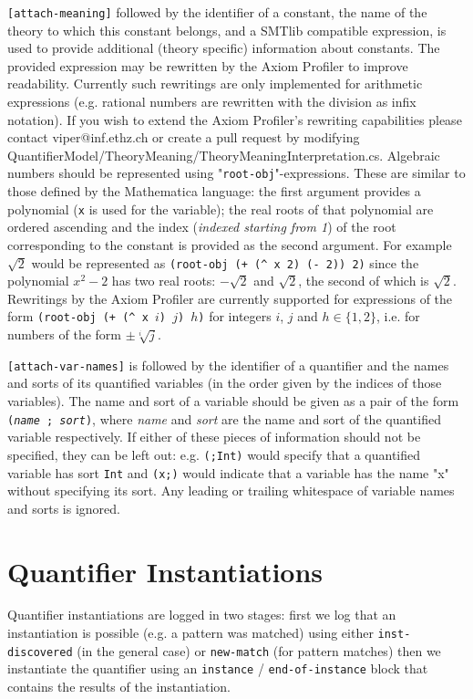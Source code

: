 \documentclass[orivec]{llncs}
\def\noskip{\vspace{-12pt}}
\begin{document}
\texttt{[attach-meaning]} followed by the identifier of a constant, the name of the theory to which this constant belongs, and a SMTlib compatible expression, is used to provide additional (theory specific) information about constants. The provided expression may be rewritten by the Axiom Profiler to improve readability. Currently such rewritings are only implemented for arithmetic expressions (e.g. rational numbers are rewritten with the division as infix notation). If you wish to extend the Axiom Profiler's rewriting capabilities please contact viper@inf.ethz.ch or create a pull request by modifying QuantifierModel/TheoryMeaning/TheoryMeaningInterpretation.cs. Algebraic numbers should be represented using "\texttt{root-obj}"-expressions. These are similar to those defined by the Mathematica language: the first argument provides a polynomial (\texttt{x} is used for the variable); the real roots of that polynomial are ordered ascending and the index (\emph{indexed starting from 1}) of the root corresponding to the constant is provided as the second argument. For example $ \sqrt{2} $ would be represented as \texttt{(root-obj (+ (\textasciicircum\ x 2) (- 2)) 2)} since the polynomial $ x^2 - 2 $ has two real roots: $ - \sqrt{2} $ and $ \sqrt{2} $, the second of which is $ \sqrt{2} $. Rewritings by the Axiom Profiler are currently supported for expressions of the form \texttt{(root-obj (+ (\textasciicircum\ x $ i $) $ j $) $ h $)} for integers $ i $, $ j $ and $ h \in \{ 1, 2 \} $, i.e. for numbers of the form $ \pm \sqrt[i]{j} $.

\texttt{[attach-var-names]} is followed by the identifier of a quantifier and the names and sorts of its quantified variables (in the order given by the indices of those variables). The name and sort of a variable should be given as a pair of the form \texttt{(\emph{name} ; \emph{sort})}, where \emph{name} and \emph{sort} are the name and sort of the quantified variable respectively. If either of these pieces of information should not be specified, they can be left out: e.g. \texttt{(;Int)} would specify that a quantified variable has sort \texttt{Int} and \texttt{(x;)} would indicate that a variable has the name "x" without specifying its sort. Any leading or trailing whitespace of variable names and sorts is ignored.

\section{Quantifier Instantiations}
\noskip
Quantifier instantiations are logged in two stages: first we log that an instantiation is possible (e.g. a pattern was matched) using either \texttt{inst-discovered} (in the general case) or \texttt{new-match} (for pattern matches) then we instantiate the quantifier using an \texttt{instance} / \texttt{end-of-instance} block that contains the results of the instantiation.
\end{document}
